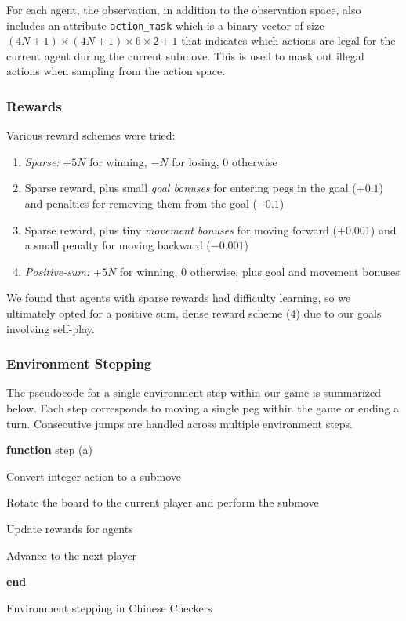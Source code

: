 \documentclass[12pt, a4paper, twocolumn]{article}
\begin{document}
For each agent, the observation, in addition to the observation space, also includes an attribute \texttt{action\_mask} which is a binary vector of size $(4N + 1) \times (4N + 1) \times 6 \times 2 + 1$ that indicates which actions are legal for the current agent during the current submove. This is used to mask out illegal actions when sampling from the action space.

\subsubsection{Rewards}

Various reward schemes were tried:

\begin{enumerate}
  \item \textit{Sparse:} $+5N$ for winning, $-N$ for losing, $0$ otherwise
  \item Sparse reward, plus small \textit{goal bonuses} for entering pegs in the goal ($+0.1$) and penalties for removing them from the goal ($-0.1$)
  \item Sparse reward, plus tiny \textit{movement bonuses} for moving forward ($+0.001$) and a small penalty for moving backward ($-0.001$)
  \item \textit{Positive-sum:} $+5N$ for winning, $0$ otherwise, plus goal and movement bonuses
\end{enumerate}

We found that agents with sparse rewards had difficulty learning, so we ultimately opted for a positive sum, dense reward scheme (4) due to our goals involving self-play.

\subsubsection{Environment Stepping}

The pseudocode for a single environment step within our game is summarized below. Each step corresponds to moving a single peg within the game or ending a turn. Consecutive jumps are handled across multiple environment steps.

\begin{algorithm}

  \textbf{function} step (a)
  
  \Indp

  \Input{\textit{a}: Integer action in $[0, (4N + 1) \times (4N + 1) \times 6 \times 2 + 1)$}
  
  Convert integer action to a submove

  Rotate the board to the current player and perform the submove

  Update rewards for agents

    {
      Advance to the next player
    }

  \Indm

  \textbf{end}

  \caption{Environment stepping in Chinese Checkers}
\end{algorithm}
  
\end{document}
